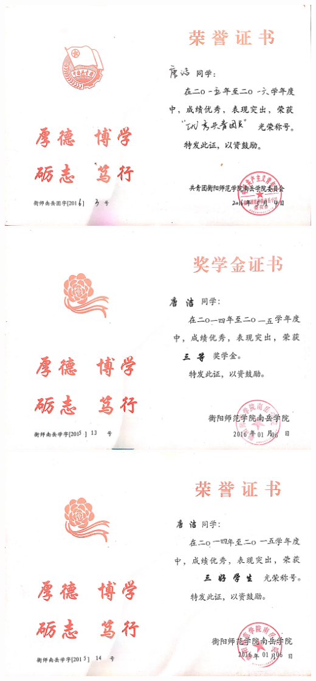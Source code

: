 \documentclass[UFT8]{ctexart}%
\begin{document}
\begin{center}
 \includegraphics[scale=0.1]{figs/2016-05.jpg }
 \includegraphics[scale=0.1]{figs/2016-01_1.jpg }
 \includegraphics[scale=0.1]{figs/2016-01_2.jpg }
\end{center}
\end{document}
